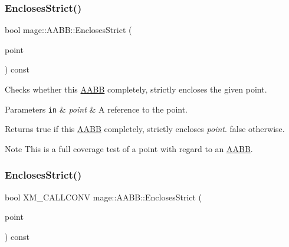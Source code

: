 \subsubsection{\texorpdfstring{Encloses\+Strict()}{EnclosesStrict()}\hspace{0.1cm}{\footnotesize\ttfamily [1/4]}}
{\footnotesize\ttfamily bool mage\+::\+A\+A\+B\+B\+::\+Encloses\+Strict (\begin{DoxyParamCaption}\item[{const \hyperlink{structmage_1_1_point3}{Point3} \&}]{point }\end{DoxyParamCaption}) const\hspace{0.3cm}{\ttfamily [noexcept]}}

Checks whether this \hyperlink{classmage_1_1_a_a_b_b}{A\+A\+BB} completely, strictly encloses the given point.


\begin{DoxyParams}[1]{Parameters}
\mbox{\tt in}  & {\em point} & A reference to the point. \\
\hline
\end{DoxyParams}
\begin{DoxyReturn}{Returns}
{\ttfamily true} if this \hyperlink{classmage_1_1_a_a_b_b}{A\+A\+BB} completely, strictly encloses {\itshape point}. {\ttfamily false} otherwise. 
\end{DoxyReturn}
\begin{DoxyNote}{Note}
This is a full coverage test of a point with regard to an \hyperlink{classmage_1_1_a_a_b_b}{A\+A\+BB}. 
\end{DoxyNote}
\hypertarget{classmage_1_1_a_a_b_b_aa8946038ce497c79fa0ee34e87aa9aed}{}\label{classmage_1_1_a_a_b_b_aa8946038ce497c79fa0ee34e87aa9aed} 
\subsubsection{\texorpdfstring{Encloses\+Strict()}{EnclosesStrict()}\hspace{0.1cm}{\footnotesize\ttfamily [2/4]}}
{\footnotesize\ttfamily bool X\+M\+\_\+\+C\+A\+L\+L\+C\+O\+NV mage\+::\+A\+A\+B\+B\+::\+Encloses\+Strict (\begin{DoxyParamCaption}\item[{F\+X\+M\+V\+E\+C\+T\+OR}]{point }\end{DoxyParamCaption}) const\hspace{0.3cm}{\ttfamily [noexcept]}}

